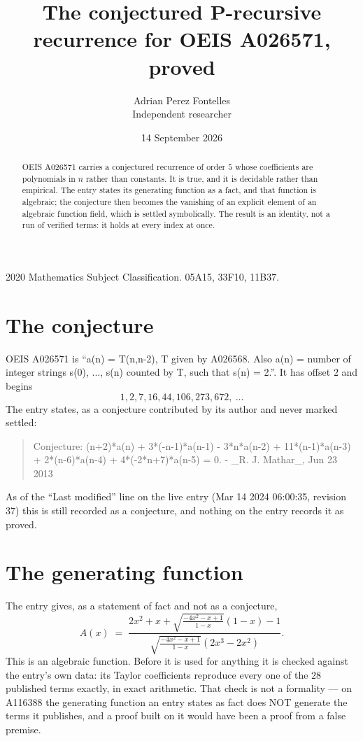 \documentclass[11pt,a4paper]{article}
\title{The conjectured P-recursive recurrence for OEIS A026571, proved}
\author{Adrian Perez Fontelles\\ \small Independent researcher}
\date{14 September 2026}
\theoremstyle{plain}
\theoremstyle{definition}
\begin{document}
\maketitle

\begin{abstract}
OEIS A026571 carries a conjectured recurrence of order $5$ whose coefficients are polynomials in
$n$ rather than constants. It is true, and it is decidable rather than empirical. The entry
states its generating function as a fact, and that function is algebraic; the conjecture then
becomes the vanishing of an explicit element of an algebraic function field, which is settled
symbolically. The result is an identity, not a run of verified terms: it holds at every index
at once.
\end{abstract}

\noindent\small 2020 Mathematics Subject Classification. 05A15, 33F10, 11B37.\normalsize

\section{The conjecture}

OEIS A026571 is ``a(n) = T(n,n-2), T given by A026568. Also a(n) = number of integer strings s(0), ..., s(n) counted by T, such that s(n) = 2.''. It has offset $2$ and begins
\[
1, 2, 7, 16, 44, 106, 273, 672,\ \dots
\]
The entry states, as a conjecture contributed by its author and never marked settled:
\begin{quote}\raggedright\small
Conjecture: (n+2)*a(n) + 3*(-n-1)*a(n-1) - 3*n*a(n-2) + 11*(n-1)*a(n-3) + 2*(n-6)*a(n-4) + 4*(-2*n+7)*a(n-5) = 0. - \_R. J. Mathar\_, Jun 23 2013
\end{quote}
As of the ``Last modified'' line on the live entry (Mar 14 2024 06:00:35, revision 37)
this is still recorded as a conjecture, and nothing on the entry records it as proved.

\section{The generating function}

The entry gives, as a statement of fact and not as a conjecture,
\[
A(x)\;=\;\frac{2 x^{2} + x + \sqrt{\frac{- 4 x^{2} - x + 1}{1 - x}} \left(1 - x\right) - 1}{\sqrt{\frac{- 4 x^{2} - x + 1}{1 - x}} \left(2 x^{3} - 2 x^{2}\right)} .
\]
This is an algebraic function. Before it is used for anything it is checked against the entry's
own data: its Taylor coefficients reproduce every one of the $28$ published terms
exactly, in exact arithmetic. That check is not a formality --- on A116388 the generating
function an entry states as fact does NOT generate the terms it publishes, and a proof built on
it would have been a proof from a false premise.
\end{document}

